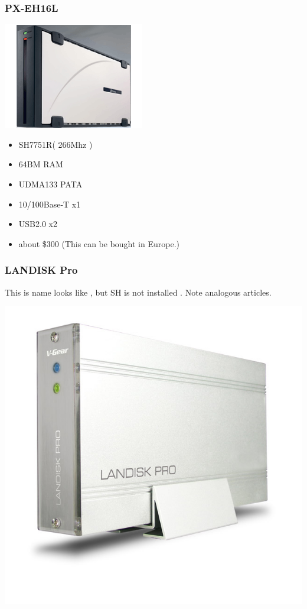 \documentclass[cjk,dvipdfm,12pt]{beamer}
\begin{document}
\begin{frame}
 \frametitle{PX-EH16L}
 \begin{minipage}[t]{0.4\hsize}
  \includegraphics[width=1.0\hsize]{image200705/PX-EH16L.png}
 \end{minipage} 
 \begin{minipage}[t]{0.5\hsize}
  \begin{itemize}
   \item SH7751R( 266Mhz )
   \item 64BM RAM
   \item UDMA133 PATA 
   \item 10/100Base-T x1
   \item USB2.0 x2 
   \item about \$300 (This can be bought in Europe.)
  \end{itemize}
 \end{minipage}
\end{frame}


\begin{frame}
 \frametitle{LANDISK Pro}
  This is name looks like , but SH is not installed . Note analogous articles. 
  \begin{center}
  \includegraphics[width=0.7\hsize]{image200705/landisk_fake.jpg}
  \end{center}
\end{frame}
\end{document}
